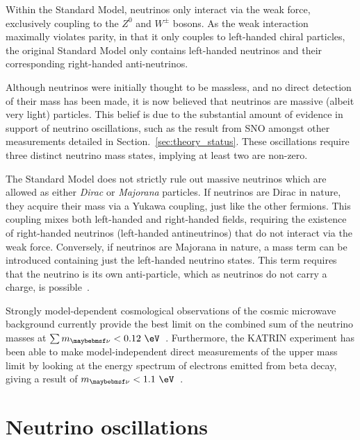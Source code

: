 Within the Standard Model, neutrinos only interact via the weak force, exclusively coupling to the
$Z^{0}$ and $W^{\pm}$ bosons. As the weak interaction maximally violates parity, in that it only
couples to left-handed chiral particles, the original Standard Model only contains left-handed
neutrinos and their corresponding right-handed anti-neutrinos.

Although neutrinos were initially thought to be massless, and no direct detection of their mass
has been made, it is now believed that neutrinos are massive (albeit very light) particles. This
belief is due to the substantial amount of evidence in support of neutrino oscillations, such as
the result from SNO amongst other measurements detailed in Section.~\ref{sec:theory_status}. These
oscillations require three distinct neutrino mass states, implying at least two are non-zero.

The Standard Model does not strictly rule out massive neutrinos which are allowed as either
\emph{Dirac} or \emph{Majorana} particles. If neutrinos are Dirac in nature, they acquire their
mass via a Yukawa coupling, just like the other fermions. This coupling mixes both left-handed and
right-handed fields, requiring the existence of right-handed neutrinos (left-handed antineutrinos)
that do not interact via the weak force. Conversely, if neutrinos are Majorana in nature, a mass
term can be introduced containing just the left-handed neutrino states. This term requires that
the neutrino is its own anti-particle, which as neutrinos do not carry a charge, is
possible~\cite{particle2020}.

Strongly model-dependent cosmological observations of the cosmic microwave background currently
provide the best limit on the combined sum of the neutrino masses at $\sum m_{\nu} <
    0.12~\eV$~\cite{planck2018}. Furthermore, the KATRIN experiment has been able to make
model-independent direct measurements of the upper mass limit by looking at the energy spectrum of
electrons emitted from beta decay, giving a result of $m_{\nu} < 1.1~\eV$~\cite{aker2019}.

\section{Neutrino oscillations} %
\label{sec:theory_oscillations} %

